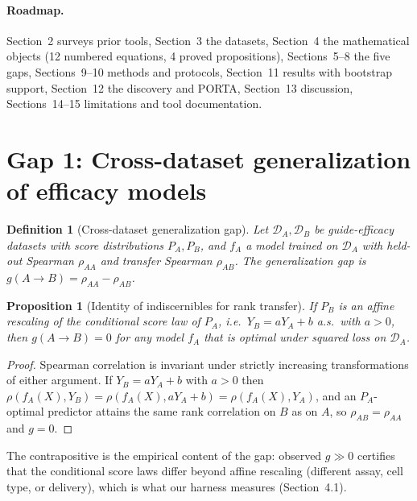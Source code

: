 \documentclass[12pt]{article}
\newtheorem{proposition}{Proposition}
\newtheorem{definition}{Definition}
\begin{document}
\paragraph{Roadmap.}
Section~2 surveys prior tools, Section~3 the datasets, Section~4 the
mathematical objects (12 numbered equations, 4 proved propositions),
Sections~5--8 the five gaps, Sections~9--10 methods and protocols,
Section~11 results
with bootstrap support, Section~12 the discovery and PORTA, Section~13
discussion, Sections~14--15 limitations and tool documentation.








\section{Gap 1: Cross-dataset generalization of efficacy models}
\begin{definition}[Cross-dataset generalization gap]
Let $\mathcal{D}_A, \mathcal{D}_B$ be guide-efficacy datasets with score
distributions $P_A, P_B$, and $f_A$ a model trained on $\mathcal{D}_A$ with
held-out Spearman $\rho_{AA}$ and transfer Spearman $\rho_{AB}$. The
generalization gap is $g(A\!\to\!B) = \rho_{AA} - \rho_{AB}$.
\end{definition}
\begin{proposition}[Identity of indiscernibles for rank transfer]\label{prop:indisc}
If $P_B$ is an affine rescaling of the conditional score law of $P_A$, i.e.\
$Y_B = aY_A + b$ a.s.\ with $a>0$, then $g(A\!\to\!B) = 0$ for any model
$f_A$ that is optimal under squared loss on $\mathcal{D}_A$.
\end{proposition}
\begin{proof}
Spearman correlation is invariant under strictly increasing transformations
of either argument. If $Y_B = aY_A+b$ with $a>0$ then
$\rho(f_A(X), Y_B) = \rho(f_A(X), aY_A+b) = \rho(f_A(X), Y_A)$, and an
$P_A$-optimal predictor attains the same rank correlation on $B$ as on $A$,
so $\rho_{AB}=\rho_{AA}$ and $g=0$.
\end{proof}
The contrapositive is the empirical content of the gap: observed
$g \gg 0$ certifies that the conditional score laws differ beyond affine
rescaling (different assay, cell type, or delivery), which is what our
harness measures (Section~4.1).
\end{document}
